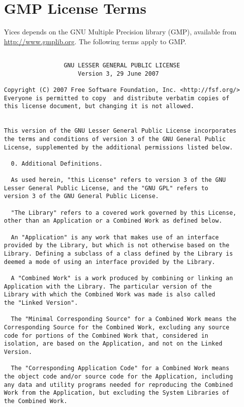 \documentclass[11pt,twoside,fleqn,openright,titlepage]{cslreport}
\begin{document}
\chapter{GMP License Terms}
\label{gmp-license}

Yices depends on the GNU Multiple Precision library (GMP), available
from \url{http://www.gmplib.org}. The following terms apply to GMP.

\begin{small}
\begin{verbatim}

                 GNU LESSER GENERAL PUBLIC LICENSE
                     Version 3, 29 June 2007

Copyright (C) 2007 Free Software Foundation, Inc. <http://fsf.org/>
Everyone is permitted to copy  and distribute verbatim copies of
this license document, but changing it is not allowed.


This version of the GNU Lesser General Public License incorporates
the terms and conditions of version 3 of the GNU General Public
License, supplemented by the additional permissions listed below.

  0. Additional Definitions.

  As used herein, "this License" refers to version 3 of the GNU
Lesser General Public License, and the "GNU GPL" refers to
version 3 of the GNU General Public License.

  "The Library" refers to a covered work governed by this License,
other than an Application or a Combined Work as defined below.

  An "Application" is any work that makes use of an interface
provided by the Library, but which is not otherwise based on the
Library. Defining a subclass of a class defined by the Library is
deemed a mode of using an interface provided by the Library.

  A "Combined Work" is a work produced by combining or linking an
Application with the Library. The particular version of the
Library with which the Combined Work was made is also called
the "Linked Version".

  The "Minimal Corresponding Source" for a Combined Work means the
Corresponding Source for the Combined Work, excluding any source
code for portions of the Combined Work that, considered in
isolation, are based on the Application, and not on the Linked
Version.

  The "Corresponding Application Code" for a Combined Work means
the object code and/or source code for the Application, including
any data and utility programs needed for reproducing the Combined
Work from the Application, but excluding the System Libraries of
the Combined Work.


\end{verbatim}
\end{small}
\end{document}
